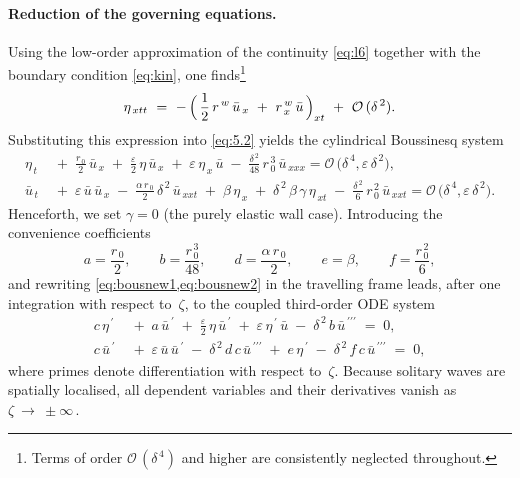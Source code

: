 \documentclass[alpha-refs, 12pt]{wiley-article}
\renewcommand{\O}{\mathcal{O}}
\newcommand{\eps}{\varepsilon}
\begin{document}
\paragraph{Reduction of the governing equations.} Using the low-order approximation of the continuity \cref{eq:l6} together with the boundary condition \eqref{eq:kin}, one finds\footnote{Terms of order $\O\,(\delta^{\,4})$ and higher are consistently neglected throughout.}
\begin{equation*}
  \eta_{\,x t t}\ =\ -\,\Bigl(\,\frac{1}{2}\,r^{\,w}\,\bar{u}_{\,x}\ +\ r^{\,w}_{\,x}\,\bar{u}\,\Bigr)_{x t}\ +\ \O\,(\delta^{\,2}).
\end{equation*}
Substituting this expression into \cref{eq:5.2} yields the cylindrical Boussinesq system
\begin{align}
  \eta_{\,t}
  &\;+\; \frac{r_{\,0}}{2}\,\bar{u}_{\,x}
       \;+\;\frac{\eps}{2}\,\eta\,\bar{u}_{\,x}
       \;+\;\eps\,\eta_{\,x}\,\bar{u}
       \;-\;\frac{\delta^{\,2}}{48}\,r_{\,0}^{\,3}\,\bar{u}_{\,xxx}
       =\O\,\bigl(\delta^{\,4},\eps\,\delta^{\,2}\bigr), 
  \label{eq:bousnew1}\\
  \bar{u}_{\,t}
  &\;+\;\eps\,\bar{u}\,\bar{u}_{\,x}
       \;-\;\frac{\alpha\,r_{\,0}}{2}\,\delta^{\,2}\,\bar{u}_{\,xxt}
       \;+\;\beta\,\eta_{\,x}
       \;+\;\delta^{\,2}\,\beta\,\gamma\,\eta_{\,x t}
       \;-\;\frac{\delta^{\,2}}{6}\,r_{\,0}^{\,2}\,\bar{u}_{\,xxt}
       =\O\,\bigl(\delta^{\,4},\eps\,\delta^{\,2}\bigr).
  \label{eq:bousnew2}
\end{align}
Henceforth, we set $\gamma = 0$ (the purely elastic wall case). Introducing the convenience coefficients
\begin{equation*}
  a=\frac{r_{\,0}}{2}, \qquad  
  b=\frac{r_{\,0}^{\,3}}{48}, \qquad
  d=\frac{\alpha\,r_{\,0}}{2}, \qquad
  e=\beta, \qquad
  f=\frac{r_{\,0}^{\,2}}{6},
\end{equation*}
and rewriting \cref{eq:bousnew1,eq:bousnew2} in the travelling frame leads, after one integration with respect to~$\zeta$, to the coupled third-order ODE system
\begin{align}
  c\,\eta^{\,\prime}
  &\;+\;a\,\bar{u}^{\,\prime}
       \;+\;\frac{\eps}{2}\,\eta\,\bar{u}^{\,\prime}
       \;+\;\eps\,\eta^{\,\prime}\,\bar{u}
       \;-\;\delta^{\,2}\,b\,\bar{u}^{\,\prime\prime\prime}
       \;=\;0,
  \label{eq:5.9a} \\
  c\,\bar{u}^{\,\prime}
  &\;+\;\eps\,\bar{u}\,\bar{u}^{\,\prime}
       \;-\;\delta^{\,2}\,d\,c\,\bar{u}^{\,\prime\prime\prime}
       \;+\;e\,\eta^{\,\prime}
       \;-\;\delta^{\,2}\,f\,c\,\bar{u}^{\,\prime\prime\prime}
       \;=\;0,
  \label{eq:5.10a}
\end{align}
where primes denote differentiation with respect to~$\zeta$. Because solitary waves are spatially localised, all dependent variables and their derivatives vanish as $\zeta\ \to\ \pm\infty\,$.
\end{document}
